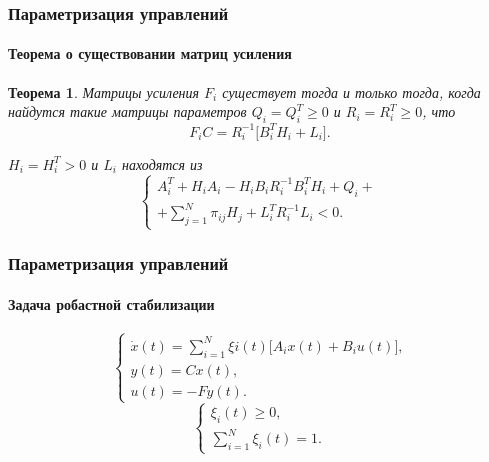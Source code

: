 \documentclass[ignorenonframetext,hyperref={pdftex,unicode},compress,handout]{beamer}
\newcommand{\br}{\vspace{12pt}}
\newtheorem{teo}{Теорема}
\begin{document}
\begin{frame}
    \frametitle{Параметризация управлений}
    \framesubtitle{Теорема о существовании матриц усиления}
    \small
    \begin{teo}
        \par Матрицы усиления $F_i$ существует тогда и только тогда, когда найдутся такие матрицы параметров $Q_i = Q_i^T \geqslant 0$ и $R_i = R_i^T \geqslant 0$, что
        \begin{equation}
            F_iC = R_i^{-1}\big[ B_i^TH_i + L_i \big]\mbox{.}
        \end{equation}
        \br
        \par $H_i = H_i^T > 0$ и $L_i$ находятся из
        \begin{equation}
            \left\{
                \begin{array}{l}
                    A_i^T + H_iA_i - H_iB_iR_i^{-1}B_i^TH_i + Q_i + \\
                    + \sum_{j=1}^N \pi_{ij}H_j + L_i^TR_i^{-1}L_i < 0\mbox{.}
                \end{array}
            \right.
        \end{equation}
    \end{teo}
\end{frame}




\begin{frame}
    \frametitle{Параметризация управлений}
    \framesubtitle{Задача робастной стабилизации}
    \begin{equation}
        \left\{
            \begin{array}{l}
                \dot{x}(t) = \sum\limits_{i=1}^N \xi i(t)\big[ A_ix(t) + B_iu(t) \big]\mbox{,} \\
                y(t) = Cx(t)\mbox{,} \\
                u(t) = -Fy(t)\mbox{.}
            \end{array}
        \right.
    \end{equation}
    \br
    \begin{equation}
        \left\{
            \begin{array}{l}
                \xi_i(t) \geqslant 0\mbox{,} \\
                \sum_{i=1}^N\xi_i(t) = 1\mbox{.}
            \end{array}
        \right.
    \end{equation}
\end{frame}
\end{document}
